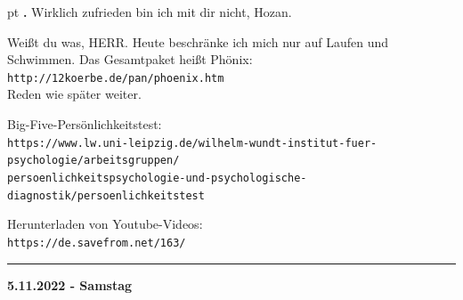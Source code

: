 \documentclass[10pt,a4paper]{article}
\newcounter{notec}
\newcommand\notep[1]{%
  \stepcounter{notec}
  \vskip #1pt
  {\bf\arabic{notec}.}
}
\newcommand\rele[1] {{\color {english} \bf {#1}}}              %
\newcommand\ddivide {\vskip -9pt \hrule \vskip 6pt}
\begin{document}
\begin{mdframed}[style=daystyle]
  \setcounter{notec}{0}
  
  \notep 0 Wirklich zufrieden bin ich mit dir nicht, Hozan.

  \vskip 2pt
  Weißt du was, HERR. Heute beschränke ich mich nur auf Laufen und Schwimmen.
  Das Gesamtpaket heißt Phönix: \\
  \verb+http://12koerbe.de/pan/phoenix.htm+ \\
  Reden wie später weiter.

  \vskip 2pt
  Big-Five-Persönlichkeitstest: \\
  \verb+https://www.lw.uni-leipzig.de/wilhelm-wundt-institut-fuer-psychologie/arbeitsgruppen/+ \\
  \verb+persoenlichkeitspsychologie-und-psychologische-diagnostik/persoenlichkeitstest+

  \vskip 2pt
  Herunterladen von Youtube-Videos: \\
  \verb+https://de.savefrom.net/163/+

\end{mdframed}


\ddivide
{\rele {5.11.2022 - Samstag}}
\end{document}
